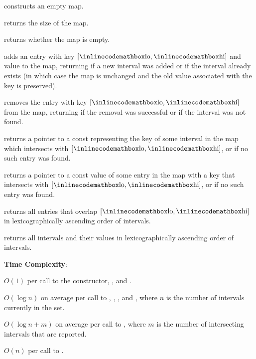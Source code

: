 \begin{compactitem}
  \item {} constructs an empty map.
  \item {} returns the size of the map.
  \item {} returns whether the map is empty.
  \item {} adds an entry with key $[{\inlinecodemath{lo}}, {\inlinecodemath{hi}}]$ and value  to the map, returning  if a new interval was added or  if the interval already exists (in which case the map is unchanged and the old value associated with the key is preserved).
  \item {} removes the entry with key $[{\inlinecodemath{lo}}, {\inlinecodemath{hi}}]$ from the map, returning  if the removal was successful or  if the interval was not found.
  \item {} returns a pointer to a const  representing the key of some interval in the map which intersects with $[{\inlinecodemath{lo}}, {\inlinecodemath{hi}}]$, or  if no such entry was found.
  \item {} returns a pointer to a const value of some entry in the map with a key that intersects with $[{\inlinecodemath{lo}}, {\inlinecodemath{hi}}]$, or  if no such entry was found.
  \item {} returns all entries that overlap $[{\inlinecodemath{lo}}, {\inlinecodemath{hi}}]$ in lexicographically ascending order of intervals.
  \item {} returns all intervals and their values in lexicographically ascending order of intervals.
\end{compactitem}

\textbf{Time Complexity}:
\begin{compactitem}
  \item $O(1)$ per call to the constructor, , and .
  \item $O(\log n)$ on average per call to , , , and , where $n$ is the number of intervals currently in the set.
  \item $O(\log n + m)$ on average per call to , where $m$ is the number of intersecting intervals that are reported.
  \item $O(n)$ per call to .
\end{compactitem}

